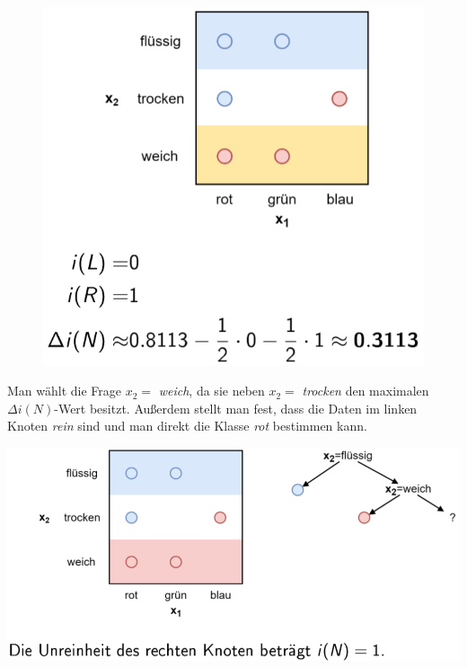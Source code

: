 \documentclass{report}
\begin{document}
\begin{figure}[H]
  \centering
  \begin{minipage}[b]{0.4\textwidth}
    \includegraphics[scale=.235]{ml07_19}
  \end{minipage}
\end{figure}

Man wählt die Frage $x_2 = $ \textit{weich}, da sie neben $x_2 = $ \textit{trocken} den maximalen $\Delta i(N)$-Wert
besitzt. Außerdem stellt man fest, dass die Daten im linken Knoten \textit{rein} sind und man direkt die Klasse
\textit{rot} bestimmen kann.

\begin{center}
  \includegraphics[scale=.3]{ml07_20}
\end{center}
\end{document}
